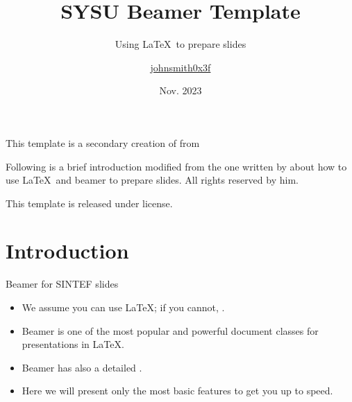 \documentclass{beamer}
\title{SYSU Beamer Template}
\subtitle{Using \LaTeX\ to prepare slides}
\author{\href{https://github.com/johnsmith0x3f}{johnsmith0x3f}}
\date{Nov. 2023}
\begin{document}
\maketitle

\begin{frame}
    This template is a secondary creation of  from  \vspace{\baselineskip}

    Following is a brief introduction modified from the one written by  about how to use \LaTeX\ and beamer to prepare slides. All rights reserved by him.\vspace{\baselineskip}

    This template is released under  license.
\end{frame}

\section{Introduction}

\begin{frame}{Beamer for SINTEF slides}{\thesection \, \secname}
    \begin{itemize}
        \item We assume you can use \LaTeX; if you cannot, .
        \item Beamer is one of the most popular and powerful document classes for presentations in \LaTeX.
        \item Beamer has also a detailed .
        \item Here we will present only the most basic features to get you up to speed.
    \end{itemize}
\end{frame}
\end{document}
